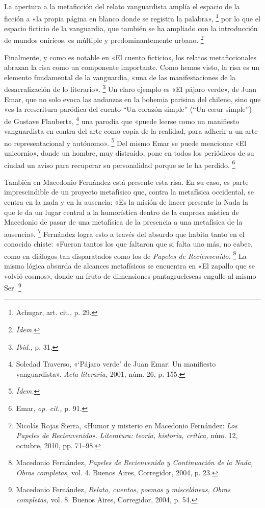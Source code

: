 \documentclass[14pt,twoside,final]{extbook} %
\let\oldfootnote\footnote
\renewcommand\footnote[1]{%
\oldfootnote{\hspace{1mm}#1}}
\begin{document}
La apertura a la metaficción del relato vanguardista amplía el espacio de la ficción a «la propia página en blanco donde se registra la palabra»,\footnote{Achugar, art. cit., p. 29.} por lo que el espacio ficticio de la vanguardia, que también se ha ampliado con la introducción de mundos oníricos, es múltiple y predominantemente urbano.\footnote{\em Ídem.}

Finalmente, y como es notable en «El cuento ficticio», los relatos metaficcionales abrazan la risa como un componente importante. Como hemos visto, la risa es un elemento fundamental de la vanguardia, «una de las manifestaciones de la desacralización de lo literario».\footnote{\emph{Ibid.,} p. 31.} Un claro ejemplo es «El pájaro verde», de Juan Emar, que no solo evoca las andanzas en la bohemia parisina del chileno, sino que «es la reescritura paródica del cuento ``Un corazón simple'' (``Un c\oe ur simple'') de Gustave Flaubert»,\footnote{Soledad Traverso, «`Pájaro verde' de Juan Emar: Un manifiesto vanguardista». \emph{Acta literaria,} 2001, núm. 26, p. 155.} una parodia que «puede leerse como un manifiesto vanguardista en contra del arte como copia de la realidad, para adherir a un arte no representacional y autónomo».\footnote{\em Ídem.} Del mismo Emar se puede mencionar «El unicornio», donde un hombre, muy distraído, pone en todos los periódicos de su ciudad un aviso para recuperar su personalidad porque se le ha perdido.\footnote{Emar, \emph{op. cit.,} p. 91.}

También en Macedonio Fernández está presente esta risa. En su caso, es parte imprescindible de un proyecto metafísico que, contra la metafísica occidental, se centra en la nada y en la ausencia: «Es la misión de hacer presente la Nada la que le da un lugar central a la humorística dentro de la empresa mística de Macedonio de pasar de una metafísica de la presencia a una metafísica de la ausencia».\footnote{Nicolás Rojas Sierra, «Humor y misterio en Macedonio Fernández: \emph{Los Papeles de Recienvenido}». \emph{Literatura: teoría, historia, crítica,} núm. 12, octubre, 2010, pp. 71--98.} Fernández logra esto a través del absurdo que habita tanto en el conocido chiste: «Fueron tantos los que faltaron que si falta uno más, no cabe», como en diálogos tan disparatados como los de \emph{Papeles de Recienvenido.}\footnote{Macedonio Fernández, \emph{Papeles de Recienvenido y Continuación de la Nada, Obras completas,} vol. 4. Buenos Aires, Corregidor, 2004, p. 23.} La misma lógica absurda de alcances metafísicos se encuentra en «El zapallo que se volvió cosmos», donde un fruto de dimensiones pantagruelescas engulle al mismo Ser.\footnote{Macedonio Fernández, \emph{Relato, cuentos, poemas y misceláneas, Obras completas,} vol. 8. Buenos Aires, Corregidor, 2004, p. 54.}
\end{document}

